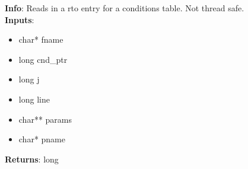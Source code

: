 \textbf{Info}: Reads in a rto entry for a conditions table. Not thread safe. \\

\noindent \textbf{Inputs}:
\begin{itemize}
\item{char* fname}
\item{long cnd\_ptr}
\item{long j}
\item{long line}
\item{char** params}
\item{char* pname}
\end{itemize}

\noindent \textbf{Returns}: long
